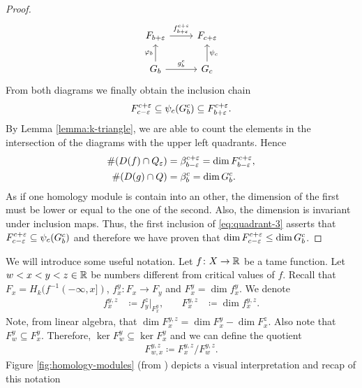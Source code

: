 \begin{proof}
\begin{equation}
\begin{tikzcd}
        F_{b+\e} \arrow[r, "f_{b+\e}^{c+\e}"]
        & F_{c+\e} \\
        G_b \arrow[r, "g_b^c"] \arrow[u, "\varphi_{b}"]
        & G_c \arrow[u, "\psi_c"']        
    \end{tikzcd}
    \end{equation}
    From both diagrams we finally obtain the inclusion chain
    \begin{align}  \label{eq:quadrant-3}
        F_{c-\varepsilon}^{c+\varepsilon} \subseteq \psi_c (G_b^c) \subseteq F_{b+\varepsilon}^{c+\varepsilon}.
    \end{align}
    By Lemma \ref{lemma:k-triangle}, we are able to count the elements in the intersection of the diagrams with the upper left quadrants. Hence
    \begin{align}
        \#(D(f) \cap Q_\varepsilon) &= \beta_{b-\varepsilon}^{c+\varepsilon} = \dim F_{b-\varepsilon}^{c+\varepsilon}, \\
        \#(D(g) \cap Q) &= \beta_b^c = \dim G_b^c.
    \end{align}
    As if one homology module is contain into an other, the dimension of the first must be lower or equal to the one of the second. Also, the dimension is invariant under inclusion maps. Thus, the first inclusion of \eqref{eq:quadrant-3} asserts that $ F_{c-\varepsilon}^{c+\varepsilon} \subseteq \psi_c (G_b^c) $ and therefore we have proven that $ \dim F_{c-\varepsilon}^{c+\varepsilon} \leq  \dim G_b^c $.
\end{proof} 

We will introduce some useful notation. Let $ f\colon X \to \mathbb R $ be a tame function. Let $ w < x < y < z \in \mathbb R $ be numbers different from critical values of $ f $. Recall that $ F_x = H_k(f^{-1}(-\infty, x]) $, $ f_x^y \colon F_x \to F_y $ and $ F_x^y = \dim f_x^y $. We denote
\begin{align}
    f_x^{y, z} &\coloneq f_y^z \rvert_{F_x^y},
    \quad &
    F_x^{y, z} &\coloneq \dim f_x^{y, z}.
\end{align}
Note, from linear algebra, that $ \dim F_x^{y,z} = \dim F_x^y - \dim F_x^z $. Also note that $ F_w^y \subseteq F_x^y $. Therefore, $ \ker F_w^y \subseteq \ker F_x^y $ and we can define the quotient
\begin{align}
    F_{w,x}^{y,z} \coloneq F_x^{y,z} / F_w^{y,z}.
\end{align}
Figure \ref{fig:homology-modules} (from \cite{Edelsbrunner}) depicts a visual interpretation and recap of this notation

